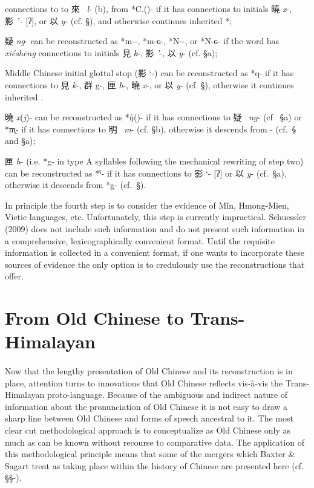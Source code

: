 \begin{description}
connections to to 來~ \emph{l}- (b), from *C.{}({})- if it has \emph{
}connections to initials 曉 \emph{x}-, 影~'- {[}ʔ], or 以  \emph{y}-
(cf. §), and otherwise continues inherited *{};
\item
疑 \emph{ng}- can be reconstructed as *m-{}-, *m-ɢ-, *N-{}-, or *N-ɢ- if
the word has \emph{xiéshēng }connections to initials 見 \emph{k}-, 影
\emph{'}-, 以  \emph{y}- (cf. §a);
\item
Middle Chinese initial glottal stop (影 `-) can be re­con­structed as
*q- if it has connections to 見 \emph{k}-, 群 g-, 匣 \emph{h}-, 曉
 \emph{x}-, or 以  \emph{y}- (cf. §), otherwise it continues inherited
{}.
\item
曉 \emph{x}(\emph{j})- can be reconstructed as *ŋ̊({})- if it has
connections to 疑~ \emph{ng}- (cf~ §a) or *m̥{}- if it has con­nec­tions to
明~ \emph{m}- (cf. §b), other­wise it descends from {}- (cf.~§ and §a);
\item
匣 \emph{h}- (i.e. *g- in type A syllables following the mechanical
rewriting of step two) can be re­con­structed as *{}ˁ- if it has
connections to 影 `- {[}ʔ] or 以  \emph{y}- (cf.~§a), otherwise it
descends from *g- (cf.~§).
\end{description}

In principle the fourth step is to consider the evidence of Mǐn,
Hmong-Mien, Vietic languages, etc. Unfortunately, this step is currently
impractical. Schuessler (2009) does not include such information and
\citet[]{Baxter2014OldChinese}
do not present such information in a
comprehensive, lexicographically convenient format. Until the requisite
information is collected in a convenient format, if one wants to
incorporate these sources of evidence the only option is to credulously
use the reconstructions that 
\citet[]{Baxter2014OldChinese}
offer.

\section{From Old Chinese to
Trans-Himalayan}\label{from-old-chinese-to-trans-himalayan}

\paragraph{}Now that the lengthy presentation of Old Chinese and its
reconstruction is in place, attention turns to innovations that Old
Chinese reflects vis-à-vis the Trans-Himalayan proto-language. Because
of the ambiguous and indirect nature of information about the
pronunciation of Old Chinese it is not easy to draw a sharp line between
Old Chinese and forms of speech ancestral to it. The most clear cut
methodological approach is to conceptualize as Old Chinese only as much
as can be known without recourse to comparative data. The application of
this methodological principle means that some of the mergers which
Baxter \& Sagart treat as taking place within the history of Chinese are
presented here (cf. §§-).

